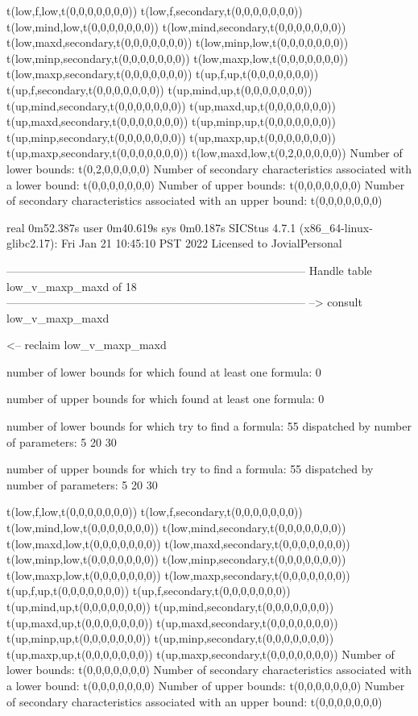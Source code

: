 t(low,f,low,t(0,0,0,0,0,0,0))
t(low,f,secondary,t(0,0,0,0,0,0,0))
t(low,mind,low,t(0,0,0,0,0,0,0))
t(low,mind,secondary,t(0,0,0,0,0,0,0))
t(low,maxd,secondary,t(0,0,0,0,0,0,0))
t(low,minp,low,t(0,0,0,0,0,0,0))
t(low,minp,secondary,t(0,0,0,0,0,0,0))
t(low,maxp,low,t(0,0,0,0,0,0,0))
t(low,maxp,secondary,t(0,0,0,0,0,0,0))
t(up,f,up,t(0,0,0,0,0,0,0))
t(up,f,secondary,t(0,0,0,0,0,0,0))
t(up,mind,up,t(0,0,0,0,0,0,0))
t(up,mind,secondary,t(0,0,0,0,0,0,0))
t(up,maxd,up,t(0,0,0,0,0,0,0))
t(up,maxd,secondary,t(0,0,0,0,0,0,0))
t(up,minp,up,t(0,0,0,0,0,0,0))
t(up,minp,secondary,t(0,0,0,0,0,0,0))
t(up,maxp,up,t(0,0,0,0,0,0,0))
t(up,maxp,secondary,t(0,0,0,0,0,0,0))
t(low,maxd,low,t(0,2,0,0,0,0,0))
Number of lower bounds:                                             t(0,2,0,0,0,0,0)
Number of secondary characteristics associated with a lower bound:  t(0,0,0,0,0,0,0)
Number of upper bounds:                                             t(0,0,0,0,0,0,0)
Number of secondary characteristics associated with an upper bound: t(0,0,0,0,0,0,0)

real	0m52.387s
user	0m40.619s
sys	0m0.187s
SICStus 4.7.1 (x86_64-linux-glibc2.17): Fri Jan 21 10:45:10 PST 2022
Licensed to JovialPersonal


--------------------------------------------------------------------------------
Handle table low_v_maxp_maxd of 18
--------------------------------------------------------------------------------
--> consult low_v_maxp_maxd

<-- reclaim low_v_maxp_maxd

number of lower bounds for which found at least one formula: 0

number of upper bounds for which found at least one formula: 0

number of lower bounds for which try to find a formula: 55
dispatched by number of parameters: 5  20  30

number of upper bounds for which try to find a formula: 55
dispatched by number of parameters: 5  20  30

t(low,f,low,t(0,0,0,0,0,0,0))
t(low,f,secondary,t(0,0,0,0,0,0,0))
t(low,mind,low,t(0,0,0,0,0,0,0))
t(low,mind,secondary,t(0,0,0,0,0,0,0))
t(low,maxd,low,t(0,0,0,0,0,0,0))
t(low,maxd,secondary,t(0,0,0,0,0,0,0))
t(low,minp,low,t(0,0,0,0,0,0,0))
t(low,minp,secondary,t(0,0,0,0,0,0,0))
t(low,maxp,low,t(0,0,0,0,0,0,0))
t(low,maxp,secondary,t(0,0,0,0,0,0,0))
t(up,f,up,t(0,0,0,0,0,0,0))
t(up,f,secondary,t(0,0,0,0,0,0,0))
t(up,mind,up,t(0,0,0,0,0,0,0))
t(up,mind,secondary,t(0,0,0,0,0,0,0))
t(up,maxd,up,t(0,0,0,0,0,0,0))
t(up,maxd,secondary,t(0,0,0,0,0,0,0))
t(up,minp,up,t(0,0,0,0,0,0,0))
t(up,minp,secondary,t(0,0,0,0,0,0,0))
t(up,maxp,up,t(0,0,0,0,0,0,0))
t(up,maxp,secondary,t(0,0,0,0,0,0,0))
Number of lower bounds:                                             t(0,0,0,0,0,0,0)
Number of secondary characteristics associated with a lower bound:  t(0,0,0,0,0,0,0)
Number of upper bounds:                                             t(0,0,0,0,0,0,0)
Number of secondary characteristics associated with an upper bound: t(0,0,0,0,0,0,0)

